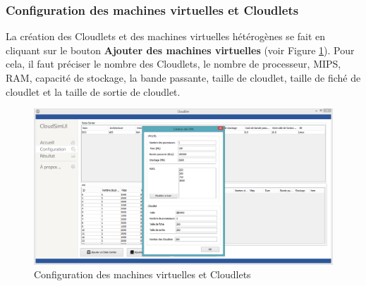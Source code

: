 \begin{onehalfspace}
\subsubsection{Configuration des machines virtuelles et Cloudlets}

La création des Cloudlets et des machines virtuelles hétérogènes  se fait en cliquant sur le bouton \textbf{Ajouter des machines virtuelles} (voir Figure \ref{CMVCs}). Pour cela, il faut  préciser le nombre des Cloudlets, le nombre de processeur, MIPS, RAM, capacité de stockage, la bande passante, taille de cloudlet, taille de fiché de cloudlet et la  taille de sortie de cloudlet.

\clearpage
\begin{figure}[!h]
\begin{center}
\includegraphics[scale=0.4]{figures/inf4.png} 
\end{center}
\caption{Configuration des machines virtuelles et Cloudlets}
\label{CMVCs}
\end{figure}


\end{onehalfspace}
